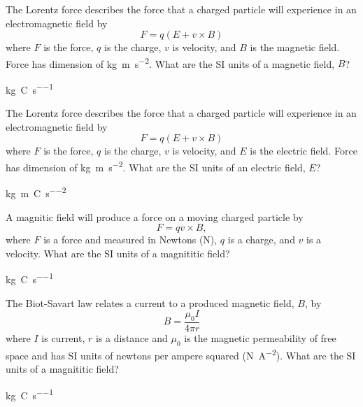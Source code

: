 \begin{question}[ID=DA07,topic=measurement,difficulty=easy]
    The Lorentz force describes the force that a charged particle
        will experience in an electromagnetic field by
    \begin{equation*}
        F = q ( E + v \times B )
    \end{equation*}
    where $F$ is the force, $q$ is the charge, $v$ is velocity,
        and $B$ is the magnetic field.
    Force has dimension of \si{\kilo\gram\meter\per\second\squared}.
    What are the SI units of a magnetic field, $B$?
\end{question}
\begin{solution}
    \si{\kilo\gram\per\coulomb\per\second}
\end{solution}

\begin{question}[ID=DA08,topic=measurement,difficulty=easy]
    The Lorentz force describes the force that a charged particle
        will experience in an electromagnetic field by
    \begin{equation*}
        F = q ( E + v \times B )
    \end{equation*}
    where $F$ is the force, $q$ is the charge, $v$ is velocity,
        and $E$ is the electric field.
    Force has dimension of \si{\kilo\gram\meter\per\second\squared}.
    What are the SI units of an electric field, $E$?
\end{question}
\begin{solution}
    \si{\kilo\gram\meter\per\coulomb\per\second\squared}
\end{solution}

\begin{question}[ID=DA09,topic=measurement,difficulty=easy]
    A magnitic field will produce a force on a moving charged particle by
    \begin{equation*}
        F = q v \times B,
    \end{equation*}
    where $F$ is a force and measured in Newtons (\si{\newton}),
        $q$ is a charge,
        and $v$ is a velocity.
    What are the SI units of a magnititic field?
\end{question}
\begin{solution}
    \si{\kilo\gram\per\coulomb\per\second}
\end{solution}

\begin{question}[ID=DA10,topic=measurement,difficulty=easy]
    The Biot-Savart law relates a current to a produced magnetic field, $B$, by
    \begin{equation*}
        B = \frac{\mu_0 I}{4\pi r}
    \end{equation*}
    where $I$ is current, $r$ is a distance and $\mu_0$ is the
        magnetic permeability of free space and has SI units of
        newtons per ampere squared (\si{\newton\per\ampere\squared}).
    What are the SI units of a magnititic field?
\end{question}
\begin{solution}
    \si{\kilo\gram\per\coulomb\per\second}
\end{solution}

